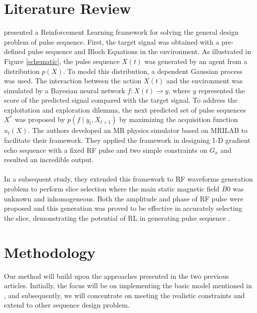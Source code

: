 \section{Literature Review}
\citet{0438} presented a Reinforcement Learning framework for solving the general design problem of pulse sequence. First, the target signal was obtained with a pre-defined pulse sequence and Bloch Equations in the environment. As illustrated in Figure \ref{schematic}, the pulse sequence $X(t)$ was generated by an agent from a distribution $p(X)$. To model this distribution, a dependent Gaussian process was used. The interaction between the action $X(t)$ and the environment was simulated by a Bayesian neural network $f:X(t) \rightarrow y$, where $y$ represented the score of the predicted signal compared with the target signal. To address the exploitation and exploration dilemma, the next predicted set of pulse sequences $X^*$ was proposed by $p\left(f \mid y_t, X_{t+1}\right)$ by maximizing the acquisition function $u_t(X)$. The authors developed an MR physics simulator based on MRILAB \citep{MRILAB} to facilitate their framework. They applied the framework in designing 1-D gradient echo sequence with a fixed RF pulse and two simple constraints on $G_x$ and resulted an incredible output. 
\\\\
In a subsequent study, they extended this framework to RF waveforms generation problem to perform slice selection where the main static magnetic field $B0$ was unknown and inhomogeneous. Both the amplitude and phase of RF pulse were proposed and this generation was proved to be effective in accurately selecting the slice, demonstrating the potential of RL in generating pulse sequence \cite{0477}. 

\section{Methodology}
Our method will build upon the approaches presented in the two previous articles. Initially, the focus will be on implementing the basic model mentioned in \citep{0438}, and subsequently, we will concentrate on meeting the realistic constraints and extend to other sequence design problem. 


